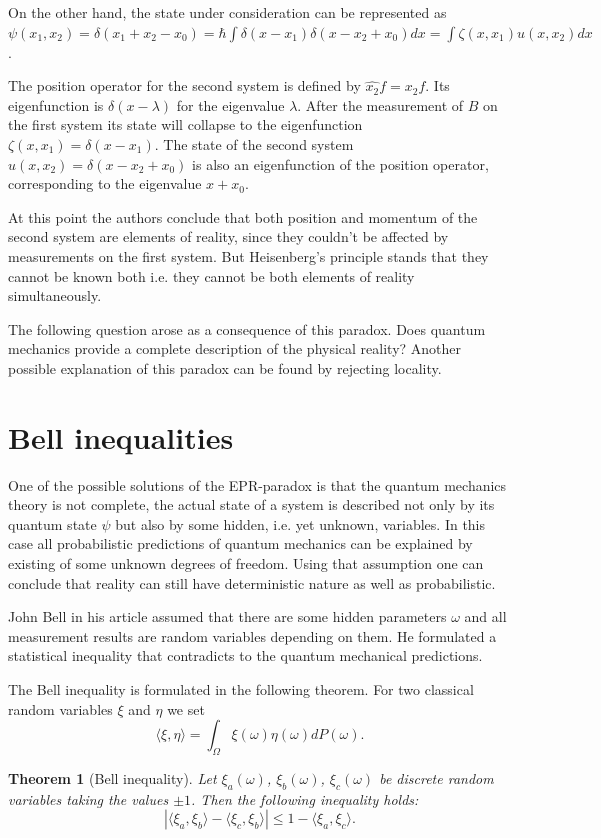 \documentclass[%
master,         %
subf,           %
href,           %
colorlinks=true %
]{disser}
\numberwithin{equation}{section}
\numberwithin{figure}{section}
\newtheorem{theorem}{Theorem}[section]
\begin{document}
On the other hand, the state under consideration can be represented as $\psi(x_1, x_2) = \delta(x_1 + x_2 - x_0) = \hbar\int\delta(x - x_1)\delta (x - x_2 + x_0)dx = \int\zeta(x, x_1)u(x, x_2)dx$. 

The position operator for the second system is defined by $\hat{x_2}f = x_2f$. Its eigenfunction is $\delta(x - \lambda)$ for the eigenvalue $\lambda$. After the measurement of $B$ on the first system its state will collapse to the eigenfunction $\zeta(x, x_1) = \delta(x - x_1)$. The state of the second system $u(x, x_2) = \delta(x - x_2 + x_0)$ is also an eigenfunction of the position operator, corresponding to the eigenvalue $x + x_0$.

At this point the authors conclude that both position and momentum of the second system are elements of reality, since they couldn't be affected by measurements on the first system. But Heisenberg's principle stands that they cannot be known both i.e. they cannot be both elements of reality simultaneously. 

The following question arose as a consequence of this paradox. Does quantum mechanics provide a complete description of the physical reality? Another possible explanation of this paradox can be found by rejecting locality.

\section{Bell inequalities}
One of the possible solutions of the EPR-paradox is that the quantum mechanics theory is not complete, the actual state of a system is described not only by its quantum state $\psi$ but also by some hidden, i.e. yet unknown, variables. In this case all probabilistic predictions of quantum mechanics can be explained by existing of some unknown degrees of freedom. Using that assumption one can conclude that reality can still have deterministic nature as well as probabilistic.

John Bell in his article \cite{Bell} assumed that there are some hidden parameters $\omega$ and all measurement results are random variables depending on them. He formulated a statistical inequality that contradicts to the quantum mechanical predictions.

The Bell inequality is formulated in the following theorem.
For two classical random variables $\xi$ and $\eta$ we set 
\[
\langle \xi, \eta \rangle = \int_\Omega \xi(\omega)\eta(\omega)dP(\omega).
\]
\begin{theorem}[Bell inequality]
Let $\xi_a(\omega)$, $\xi_b(\omega)$, $\xi_c(\omega)$ be discrete random variables taking the values $\pm 1$. Then the following inequality holds:
\[
| \langle\xi_a,\xi_b\rangle -  \langle\xi_c,\xi_b\rangle | \leq 1 - \langle\xi_a,\xi_c\rangle.
\]
\label{thm:Bell_ineq}
\end{theorem}
\end{document}
